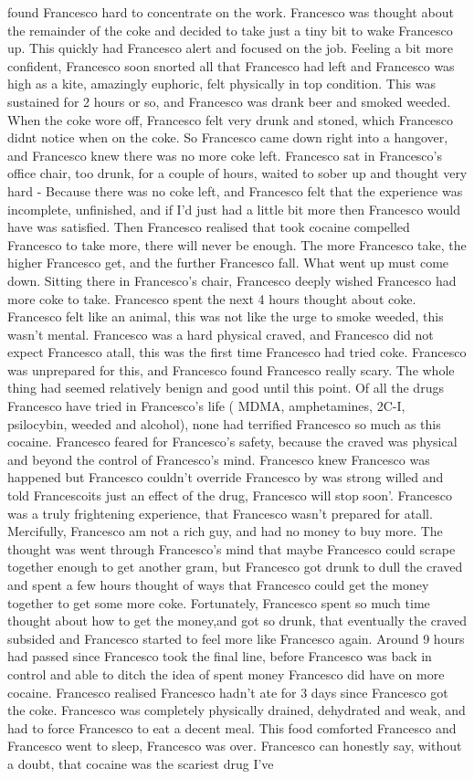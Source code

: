 \documentclass[12pt]{book}
\begin{document}
found Francesco hard to concentrate on the work. Francesco was thought about the remainder of the coke and decided to take just a tiny bit to wake Francesco up. This quickly had Francesco alert and focused on the job. Feeling a bit more confident, Francesco soon snorted all that Francesco had left and Francesco was high as a kite, amazingly euphoric, felt physically in top condition. This was sustained for 2 hours or so, and Francesco was drank beer and smoked weeded. When the coke wore off, Francesco felt very drunk and stoned, which Francesco didnt notice when on the coke. So Francesco came down right into a hangover, and Francesco knew there was no more coke left. Francesco sat in Francesco's office chair, too drunk, for a couple of hours, waited to sober up and thought very hard - Because there was no coke left, and Francesco felt that the experience was incomplete, unfinished, and if I'd just had a little bit more then Francesco would have was satisfied. Then Francesco realised that took cocaine compelled Francesco to take more, there will never be enough. The more Francesco take, the higher Francesco get, and the further Francesco fall. What went up must come down. Sitting there in Francesco's chair, Francesco deeply wished Francesco had more coke to take. Francesco spent the next 4 hours thought about coke. Francesco felt like an animal, this was not like the urge to smoke weeded, this wasn't mental. Francesco was a hard physical craved, and Francesco did not expect Francesco atall, this was the first time Francesco had tried coke. Francesco was unprepared for this, and Francesco found Francesco really scary. The whole thing had seemed relatively benign and good until this point. Of all the drugs Francesco have tried in Francesco's life ( MDMA, amphetamines, 2C-I, psilocybin, weeded and alcohol), none had terrified Francesco so much as this cocaine. Francesco feared for Francesco's safety, because the craved was physical and beyond the control of Francesco's mind. Francesco knew Francesco was happened but Francesco couldn't override Francesco by was strong willed and told Francescoits just an effect of the drug, Francesco will stop soon'. Francesco was a truly frightening experience, that Francesco wasn't prepared for atall. Mercifully, Francesco am not a rich guy, and had no money to buy more. The thought was went through Francesco's mind that maybe Francesco could scrape together enough to get another gram, but Francesco got drunk to dull the craved and spent a few hours thought of ways that Francesco could get the money together to get some more coke. Fortunately, Francesco spent so much time thought about how to get the money,and got so drunk, that eventually the craved subsided and Francesco started to feel more like Francesco again. Around 9 hours had passed since Francesco took the final line, before Francesco was back in control and able to ditch the idea of spent money Francesco did have on more cocaine. Francesco realised Francesco hadn't ate for 3 days since Francesco got the coke. Francesco was completely physically drained, dehydrated and weak, and had to force Francesco to eat a decent meal. This food comforted Francesco and Francesco went to sleep, Francesco was over. Francesco can honestly say, without a doubt, that cocaine was the scariest drug I've 
\end{document}

